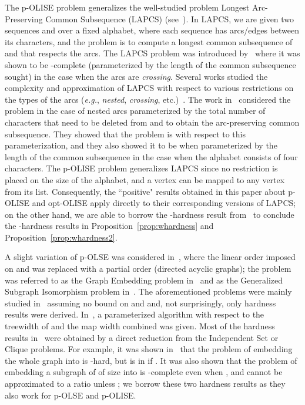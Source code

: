 \documentclass[11pt]{article}
\newcommand{\NP}{\mbox{}}
\def\eg{{\em e.g.}}
\begin{document}
The p-OLISE problem generalizes the well-studied problem {\sc Longest Arc-Preserving Common Subsequence} (LAPCS) (see~\cite{gramm,evansphd,evans,guo,guohuidam,guohui}).  In LAPCS, we are given two sequences  and  over a fixed alphabet, where each sequence has arcs/edges between its characters, and the problem is to compute a longest common subsequence of  and  that respects the arcs. The LAPCS problem was introduced by~\cite{evansphd,evans} where it was shown to be -complete (parameterized by the length of the common subsequence sought) in the case when the arcs are {\em crossing}. Several works studied the complexity and approximation of LAPCS with respect to various restrictions on the types of the arcs (\eg, {\em nested}, {\em crossing}, etc.)~\cite{gramm,evansphd,evans,guo,guohuidam,guohui}. The work in~\cite{gramm,guo} considered the problem in the case of nested arcs parameterized by the total number of characters that need to be deleted from  and  to obtain the arc-preserving common subsequence. They showed that the problem is  with respect to this parameterization, and they also showed it to be  when parameterized by the length of the common subsequence in the case when the alphabet consists of four characters. The p-OLISE problem generalizes LAPCS since no restriction is placed on the size of the alphabet, and a vertex can be mapped to any vertex from its list. Consequently, the ``positive" results obtained in this paper about p-OLISE and opt-OLISE apply directly to their corresponding versions of LAPCS; on the other hand, we are able to borrow the -hardness result from~\cite{evans} to conclude the -hardness results in Proposition~\ref{prop:whardness} and Proposition~\ref{prop:whardness2}.

A slight variation of p-OLSE was considered in~\cite{xiuzhen,xiuzhencai}, where the linear order imposed on  and  was replaced with a partial order (directed acyclic graphs); the problem was referred to as the {\sc Graph Embedding} problem in~\cite{xiuzhen} and as the {\sc Generalized Subgraph Isomorphism} problem in~\cite{xiuzhencai}. The aforementioned problems were mainly studied in~\cite{xiuzhen,xiuzhencai} assuming no bound on  and  and, not surprisingly, only hardness results were derived. In~\cite{xiuzhencai}, a parameterized algorithm with respect to the treewidth of  and the map width  combined was given. Most of the hardness results in~\cite{xiuzhen,xiuzhencai} were obtained by a direct reduction from the {\sc Independent Set} or {\sc Clique} problems. For example, it was shown in~\cite{xiuzhen} that the problem of embedding the whole graph  into  is \NP-hard, but is in  if . It was also shown that the problem of embedding a subgraph of  of size  into  is -complete even when , and cannot be approximated to a ratio  unless ; we borrow these two hardness results as they also work for p-OLSE and p-OLISE.
\end{document}
